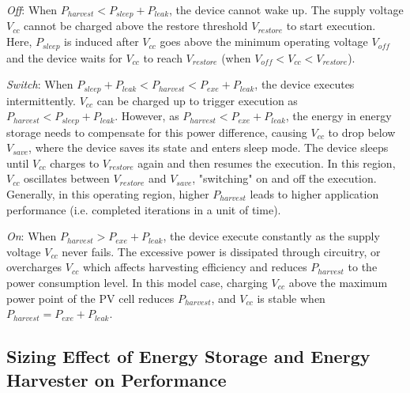 \textit{Off}: When $P_{harvest} < P_{sleep} + P_{leak}$, the device cannot wake up. The supply voltage $V_{cc}$ cannot be charged above the restore threshold $V_{restore}$ to start execution. Here, $P_{sleep}$ is induced after $V_{cc}$ goes above the minimum operating voltage $V_{off}$ and the device waits for $V_{cc}$ to reach $V_{restore}$ (when $V_{off} < V_{cc} < V_{restore}$). 

\textit{Switch}: When $P_{sleep} + P_{leak} < P_{harvest} < P_{exe} + P_{leak}$, the device executes intermittently. $V_{cc}$ can be charged up to trigger execution as $P_{harvest} < P_{sleep} + P_{leak}$. However, as $P_{harvest} < P_{exe} + P_{leak}$, the energy in energy storage needs to compensate for this power difference, causing $V_{cc}$ to drop below $V_{save}$, where the device saves its state and enters sleep mode. The device sleeps until $V_{cc}$ charges to $V_{restore}$ again and then resumes the execution. In this region, $V_{cc}$ oscillates between $V_{restore}$ and $V_{save}$, "switching" on and off the execution. Generally, in this operating region, higher $P_{harvest}$ leads to higher application performance (i.e. completed iterations in a unit of time).

\textit{On}: When $P_{harvest} > P_{exe} + P_{leak}$, the device execute constantly as the supply voltage $V_{cc}$ never fails. The excessive power is dissipated through circuitry, or overcharges $V_{cc}$ which affects harvesting efficiency and reduces $P_{harvest}$ to the power consumption level. In this model case, charging $V_{cc}$ above the maximum power point of the PV cell reduces $P_{harvest}$, and $V_{cc}$ is stable when $P_{harvest} = P_{exe} + P_{leak}$. 


\subsection{Sizing Effect of Energy Storage and Energy Harvester on Performance} \label{Section:4.2}

